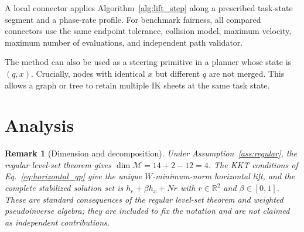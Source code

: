 \documentclass[preprint,12pt]{elsarticle}
\newcommand{\R}{\mathbb{R}}
\newtheorem{remark}{Remark}
\begin{document}
A local connector applies Algorithm~\ref{alg:lift_step} along a prescribed task-state segment and a phase-rate profile. For benchmark fairness, all compared connectors use the same endpoint tolerance, collision model, maximum velocity, maximum number of evaluations, and independent path validator.

The method can also be used as a steering primitive in a planner whose state is $(q,x)$. Crucially, nodes with identical $x$ but different $q$ are not merged. This allows a graph or tree to retain multiple IK sheets at the same task state.

\section{Analysis}
\label{sec:analysis}

\begin{remark}[Dimension and decomposition]
\label{rem:dimension_decomposition}
Under Assumption~\ref{ass:regular}, the regular level-set theorem gives $\dim\mathcal M=14+2-12=4$. The KKT conditions of Eq.~\eqref{eq:horizontal_qp} give the unique $W$-minimum-norm horizontal lift, and the complete stabilized solution set is $h_e+\beta h_x+Nr$ with $r\in\R^2$ and $\beta\in[0,1]$. These are standard consequences of the regular level-set theorem and weighted pseudoinverse algebra; they are included to fix the notation and are not claimed as independent contributions.
\end{remark}
\end{document}
